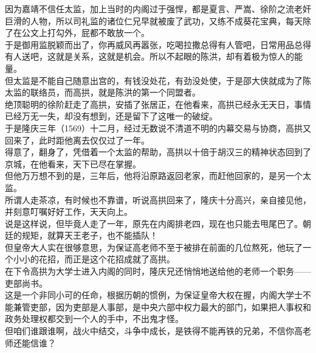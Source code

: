 \begin{multicols}{\theparacolNo}
因为嘉靖不信任太监，加上当时的内阁过于强悍，都是夏言、严嵩、徐阶之流老奸巨滑的人物，所以司礼监的诸位仁兄早就被废了武功，又练不成葵花宝典，每天除了在公文上打勾外，屁都不敢放一个。\\

于是御用监脱颖而出了，你再威风再嚣张，吃喝拉撒总得有人管吧，日常用品总得有人送吧，这就是关系，这就是机会。所以不起眼的陈洪，却有着极为惊人的能量。\\

但太监是不能自己随意出宫的，有钱没处花，有劲没处使，于是邵大侠就成为了陈太监的联络员，而高拱，就是陈洪的第一个同盟者。\\

绝顶聪明的徐阶赶走了高拱，安插了张居正，在他看来，高拱已经永无天日，事情已经万无一失，却没有想到，还是留下了这唯一的破绽。\\

于是隆庆三年（1569）十二月，经过无数说不清道不明的内幕交易与协商，高拱又回来了，此时距他离去仅仅过了一年。\\

得意了，翻身了，凭借着一个太监的帮助，高拱以十倍于胡汉三的精神状态回到了京城，在他看来，天下已尽在掌握。\\

但他万万想不到的是，三年后，他将沿原路返回老家，而赶他回家的，是另一个太监。\\

所谓人走茶凉，有时候也不靠谱，听说高拱回来了，隆庆十分高兴，亲自接见他，并刻意叮嘱好好工作，天天向上。\\

说是这样说，但毕竟人走了一年，原先在内阁排老四，现在也只能去甩尾巴了。朝廷的规矩，就算天王老子，也不能插队！\\

但皇帝大人实在很够意思，为保证高老师不至于被排在前面的几位熬死，他玩了一个小小的花招，而正是这个花招成就了高拱。\\

在下令高拱为大学士进入内阁的同时，隆庆兄还悄悄地送给他的老师一个职务——吏部尚书。\\

这是一个非同小可的任命，根据历朝的惯例，为保证皇帝大权在握，内阁大学士不能兼管吏部，因为吏部是人事部，是中央六部中权力最大的部门，如果把人事权和政务处理权都交到一个人的手中，不出鬼才怪。\\

但咱们谁跟谁啊，战火中结交，斗争中成长，是铁得不能再铁的兄弟，不信你高老师还能信谁？\\


\end{multicols}
